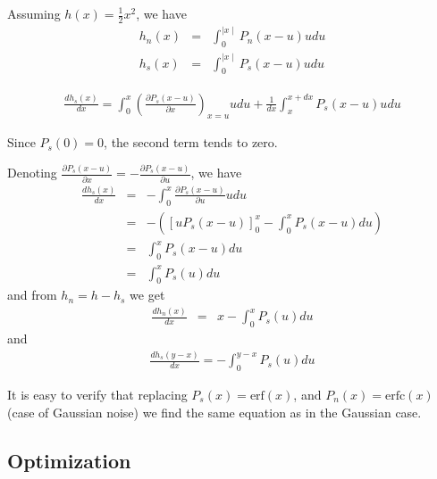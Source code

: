 Assuming $h(x) = \frac{1}{2}x^2$, we have
\begin{eqnarray}
h_n(x) & = & \int_{0}^{\mid x \mid } P_n(x-u) u du \\ \nonumber 
h_s(x) & = & \int_{0}^{\mid x \mid } P_s(x-u) u du
\end{eqnarray}


\begin{eqnarray}
\frac{ d h_{s}(x)}{dx} = \int_0^x \left( 
\frac{\partial P_s(x-u)}{\partial x}\right)_{x=u} u du +
         \frac{1}{dx}  \int_x^{x+dx} P_s(x-u) u  du
\end{eqnarray}

Since $P_s(0) = 0$, the second term tends to zero.

Denoting  $\frac{\partial P_s(x-u)}{\partial x} = - \frac{\partial P_s(x-u)}{\partial u}$, we have  
\begin{eqnarray}
\frac{ d h_{s}(x)}{dx} & = & - \int_0^x \frac{\partial P_s(x-u)}{\partial u} u du \nonumber \\
& = &  - ( [u P_s(x-u) ]_0^x - \int_0^x P_s(x-u) du) \nonumber \\
& = & \int_0^x P_s(x-u) du \nonumber \\
& = & \int_0^x P_s(u) du
\end{eqnarray}
and from $h_n = h - h_s$ we get
\begin{eqnarray}
\frac{ d h_{n}(x)}{dx} & = &  x -  \int_0^x P_s(u) du
\end{eqnarray}
and 
\begin{eqnarray}
\frac{ d h_{s}(y-x)}{dx} = - \int_0^{y-x} P_s(u) du
\end{eqnarray}

It is easy to verify that replacing $P_s(x) = \mbox{erf}(x)$, 
and $P_n(x) = \mbox{erfc}(x)$
(case of Gaussian noise) we find the same equation as in the Gaussian case.




\subsection{Optimization}

